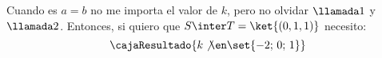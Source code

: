 \begin{enumerate}[label=(\alph*)]
        Cuando es $a = b$ no me importa el valor de $k$,  pero no olvidar $\llamada1$ y $\llamada2$.
        Entonces, si quiero que $S \inter T = \ket{(0,1,1)}$ necesito:
        $$
          \cajaResultado{
            k \not\en \set{-2;\, 0;\, 1}
          }
        $$
\end{enumerate}

\begin{aportes}
  \item {}
\end{aportes}
